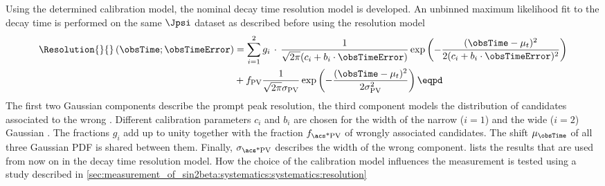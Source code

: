 Using the determined calibration model, the nominal decay time resolution model
is developed. An unbinned maximum likelihood fit to the \Bd decay time is
performed on the same $\Jpsi$ \sweighted dataset as described before using the
resolution model
%
\begin{equation}
\begin{split}
  \Resolution{}{}\left(\obsTime;\obsTimeError\right)
  &= \sum_{i=1}^{2}{g_i\,\cdot\,\frac{1}{\sqrt{2\pi}(c_i + b_i \cdot \obsTimeError)}\exp\left(-\frac{(\obsTime - \mu_t)^2}{2(c_i + b_i \cdot \obsTimeError)^2}\right)}\\
  &+ f_{\text{PV}} \frac{1}{\sqrt{2\pi} \sigma_{\text{PV}}} \exp\left(-\frac{(\obsTime - \mu_t)^2}{2 \sigma_{\text{PV}}^2}\right) \eqpd
\end{split}
\end{equation}
%
The first two Gaussian components describe the prompt peak resolution, the third
component models the distribution of candidates associated to the wrong \PV.
Different calibration parameters $c_i$ and $b_i$ are chosen for the width of the
narrow ($i=1$) and the wide ($i=2$) Gaussian \PDF. The fractions $g_i$ add up to
unity together with the fraction $f_\text{\acs*{PV}}$ of wrongly associated
candidates. The shift $\mu_{\obsTime}$ of all three Gaussian \acs{PDF} is shared
between them. Finally, $\sigma_{\text{\acs*{PV}}}$ describes the width of the
wrong \PV component. 
lists the results that are used from now on in the decay time resolution model.
How the choice of the calibration model influences the measurement is tested
using a \ToyMC study described in
\cref{sec:measurement_of_sin2beta:systematics:systematics:resolution}
%
